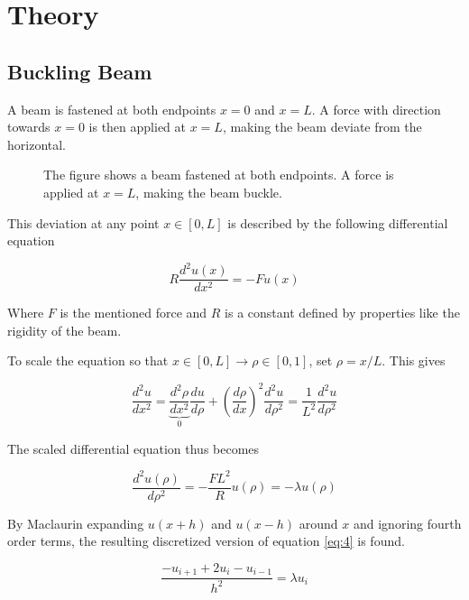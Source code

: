 \documentclass[a4paper,11pt]{article}
\begin{document}
\section{Theory}
\subsection{Buckling Beam}

A beam is fastened at both endpoints $x=0$ and $x=L$. A force with direction towards $x=0$ is then applied at $x=L$, making the beam deviate from the horizontal. 

\begin{figure}[H]
%
  \caption{The figure shows a beam fastened at both endpoints. A force is applied at $x=L$, making the beam buckle.}
  \label{fig:1}
\end{figure}

This deviation at any point $x \in [0,L] $ is described by the following differential equation 

\begin{equation}\label{eq:2}
    R \frac{d^2u(x)}{dx^2} = -F u(x)
\end{equation}

Where $F$ is the mentioned force and $R$ is a constant defined by properties like the rigidity of the beam. 

To scale the equation so that $x\in [0,L] \rightarrow \rho \in [0,1]$, set $\rho = x/L$. This gives

\begin{equation}\label{eq:3}
    \frac{d^2u}{dx^2} = \underbrace{\frac{d^2\rho}{dx^2}}_{0} \frac{du}{d\rho} + \left(\frac{d\rho}{dx}\right)^2 \frac{d^2u}{d\rho^2} = \frac{1}{L^2}\frac{d^2u}{d\rho^2}
\end{equation}

The scaled differential equation thus becomes 

\begin{equation}\label{eq:4}
    \frac{d^2u(\rho)}{d\rho^2} = -\frac{FL^2}{R} u(\rho) = -\lambda u(\rho)
\end{equation}

By Maclaurin expanding $u(x+h)$ and $u(x-h)$ around $x$ and ignoring fourth order terms, the resulting discretized version of equation \ref{eq:4} is found. 

\begin{equation}\label{eq:5}
     \frac{-u_{i+1}+2u_i - u_{i-1}}{h^2} = \lambda u_i
\end{equation}
\end{document}
